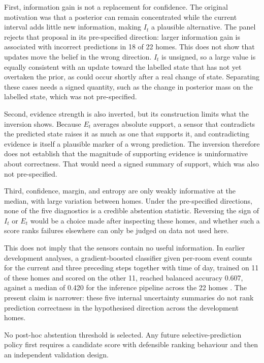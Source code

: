 \documentclass[11pt]{article}
\renewcommand{\_}{\textunderscore\allowbreak}
\begin{document}
First, information gain is not a replacement for confidence. The original motivation was that a posterior can remain concentrated while the current interval adds little new information, making $I_t$ a plausible alternative. The panel rejects that proposal in its pre-specified direction: larger information gain is associated with incorrect predictions in 18 of 22 homes. This does not show that updates move the belief in the wrong direction. $I_t$ is unsigned, so a large value is equally consistent with an update toward the labelled state that has not yet overtaken the prior, as could occur shortly after a real change of state. Separating these cases needs a signed quantity, such as the change in posterior mass on the labelled state, which was not pre-specified.

Second, evidence strength is also inverted, but its construction limits what the inversion shows. Because $E_t$ averages absolute support, a sensor that contradicts the predicted state raises it as much as one that supports it, and contradicting evidence is itself a plausible marker of a wrong prediction. The inversion therefore does not establish that the magnitude of supporting evidence is uninformative about correctness. That would need a signed summary of support, which was also not pre-specified.

Third, confidence, margin, and entropy are only weakly informative at the median, with large variation between homes. Under the pre-specified directions, none of the five diagnostics is a credible abstention statistic. Reversing the sign of $I_t$ or $E_t$ would be a choice made after inspecting these homes, and whether such a score ranks failures elsewhere can only be judged on data not used here.

This does not imply that the sensors contain no useful information. In earlier development analyses, a gradient-boosted classifier given per-room event counts for the current and three preceding steps together with time of day, trained on 11 of these homes and scored on the other 11, reached balanced accuracy 0.607, against a median of 0.420 for the inference pipeline across the 22 homes \citep{ribeiro2026toolkit}. The present claim is narrower: these five internal uncertainty summaries do not rank prediction correctness in the hypothesised direction across the development homes.

No post-hoc abstention threshold is selected. Any future selective-prediction policy first requires a candidate score with defensible ranking behaviour and then an independent validation design.
\end{document}
